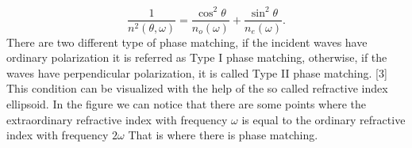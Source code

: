 \documentclass[a4paper,10pt]{article}
\begin{document}
\[\frac{1}{n^2(\theta,\omega)} = \frac{\cos^2\theta}{n_o(\omega)}+\frac{\sin^2\theta}{n_e(\omega)}.\]
There are two different type of phase matching, if the incident waves have ordinary polarization it is referred as Type I phase matching, otherwise, if the waves have perpendicular polarization, it is called Type II phase matching.
[3]
This condition can be visualized with the help of the so called refractive index ellipsoid. In the figure we can notice that there are some points where the extraordinary refractive index with frequency $\omega$ is equal to the ordinary refractive index with frequency $2\omega$ That is where there is phase matching.
\end{document}
